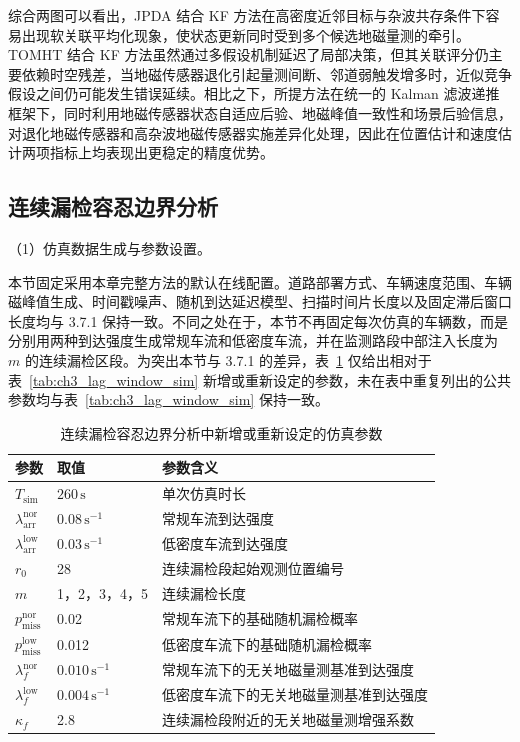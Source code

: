 \documentclass{xdupgthesis}
\begin{document}
综合两图可以看出，JPDA 结合 KF 方法在高密度近邻目标与杂波共存条件下容易出现软关联平均化现象，使状态更新同时受到多个候选地磁量测的牵引。TOMHT 结合 KF 方法虽然通过多假设机制延迟了局部决策，但其关联评分仍主要依赖时空残差，当地磁传感器退化引起量测间断、邻道弱触发增多时，近似竞争假设之间仍可能发生错误延续。相比之下，所提方法在统一的 Kalman 滤波递推框架下，同时利用地磁传感器状态自适应后验、地磁峰值一致性和场景后验信息，对退化地磁传感器和高杂波地磁传感器实施差异化处理，因此在位置估计和速度估计两项指标上均表现出更稳定的精度优势。

\subsection{连续漏检容忍边界分析}

\noindent （1）仿真数据生成与参数设置。

本节固定采用本章完整方法的默认在线配置。道路部署方式、车辆速度范围、车辆磁峰值生成、时间戳噪声、随机到达延迟模型、扫描时间片长度以及固定滞后窗口长度均与 3.7.1 保持一致。不同之处在于，本节不再固定每次仿真的车辆数，而是分别用两种到达强度生成常规车流和低密度车流，并在监测路段中部注入长度为 $m$ 的连续漏检区段。为突出本节与 3.7.1 的差异，表~\ref{tab:ch3_miss_boundary_sim} 仅给出相对于表~\ref{tab:ch3_lag_window_sim} 新增或重新设定的参数，未在表中重复列出的公共参数均与表~\ref{tab:ch3_lag_window_sim} 保持一致。

\begin{table}[H]
	\centering
	\caption{连续漏检容忍边界分析中新增或重新设定的仿真参数}
	\label{tab:ch3_miss_boundary_sim}
	\small
	\begin{tabular}{p{2.8cm}p{3.0cm}p{6.0cm}}
		\toprule
		参数 & 取值 & 参数含义 \\
		\midrule
		$T_{\mathrm{sim}}$ & $260\,\mathrm{s}$ & 单次仿真时长 \\
		$\lambda_{\mathrm{arr}}^{\mathrm{nor}}$ & $0.08\,\mathrm{s^{-1}}$ & 常规车流到达强度 \\
		$\lambda_{\mathrm{arr}}^{\mathrm{low}}$ & $0.03\,\mathrm{s^{-1}}$ & 低密度车流到达强度 \\
		$r_0$ & 28 & 连续漏检段起始观测位置编号 \\
		$m$ & 1，2，3，4，5 & 连续漏检长度 \\
		$p_{\mathrm{miss}}^{\mathrm{nor}}$ & 0.02 & 常规车流下的基础随机漏检概率 \\
		$p_{\mathrm{miss}}^{\mathrm{low}}$ & 0.012 & 低密度车流下的基础随机漏检概率 \\
		$\lambda_f^{\mathrm{nor}}$ & $0.010\,\mathrm{s^{-1}}$ & 常规车流下的无关地磁量测基准到达强度 \\
		$\lambda_f^{\mathrm{low}}$ & $0.004\,\mathrm{s^{-1}}$ & 低密度车流下的无关地磁量测基准到达强度 \\
		$\kappa_f$ & 2.8 & 连续漏检段附近的无关地磁量测增强系数 \\
		\bottomrule
	\end{tabular}
\end{table}
\end{document}
